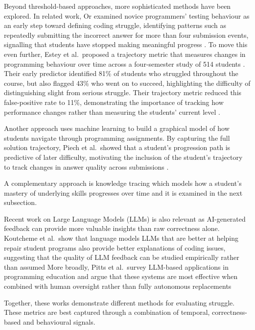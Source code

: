 Beyond threshold-based approaches, more sophisticated methods have been explored. 
In related work, Or examined novice programmers' testing behaviour as an early step toward defining coding struggle, identifying patterns such as repeatedly submitting the incorrect answer for more than four submission events, signalling that students have stopped making meaningful progress \cite{or_2024_exploring,beckWheelSpinningStudentsWho2013}.
To move this even further, Estey et al.\ proposed a trajectory metric that measures changes in programming behaviour over time across a four-semester study of 514 students \cite{estey_2017_automatically}. 
Their early predictor identified 81\% of students who struggled throughout the course, but also flagged 43\% who went on to succeed, highlighting the difficulty of distinguishing slight from serious struggle.
Their trajectory metric reduced this false-positive rate to 11\%, demonstrating the importance of tracking how performance changes rather than measuring the students' current level \cite{estey_2017_automatically}.

Another approach uses machine learning to build a graphical model of how students navigate through programming assignments. By capturing the full solution trajectory, Piech et al.\ showed that a student's progression path is predictive of later difficulty, motivating the inclusion of the student's trajectory to track changes in answer quality across submissions \cite{piech_modeling}.

A complementary approach is knowledge tracing which models how a student's mastery of underlying skills progresses over time and it is examined in the next subsection.

Recent work on Large Language Models (LLMs) is also relevant as AI-generated feedback can provide more valuable insights than raw correctness alone.
Koutcheme et al.\ show that language models LLMs that are better at helping repair student programs also provide better explanations of coding issues, suggesting that the quality of LLM feedback can be studied empirically rather than assumed \cite{koutcheme_using}
More broadly, Pitts et al.\ survey LLM-based applications in programming education and argue that these systems are most effective when combined with human oversight rather than fully autonomous replacements \cite{pitts_a}

Together, these works demonstrate different methods for evaluating struggle. These metrics are best captured through a combination of temporal, correctness-based and behavioural signals.

